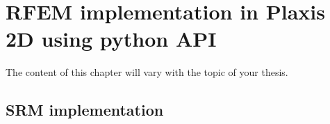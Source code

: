 \chapter[RFEM implementation in Plaxis 2D using python API]{RFEM implementation in Plaxis 2D using python API}
The content of this chapter will vary with the topic of your thesis. 


\section{SRM implementation}





